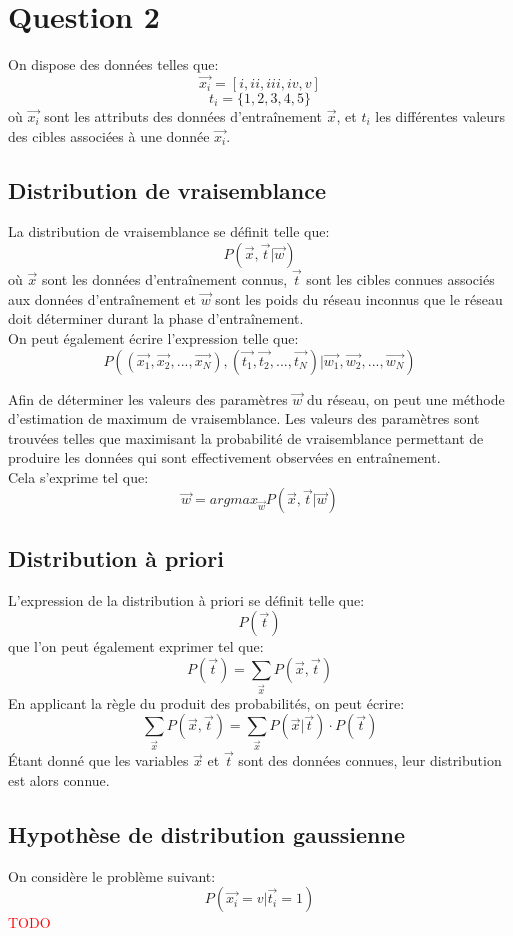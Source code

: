 \section{Question 2}
On dispose des données telles que:
$$ \overrightarrow{x_i} = [i, ii, iii, iv, v] $$
$$ t_i = \{1, 2, 3, 4, 5\} $$ 
où $\overrightarrow{x_i}$ sont les attributs des données d'entraînement $\overrightarrow{x}$, et $t_i$ les différentes valeurs des cibles associées à une donnée $\overrightarrow{x_i}$.

\subsection{Distribution de vraisemblance}
La distribution de vraisemblance se définit telle que: 
$$ P(\overrightarrow{x}, \overrightarrow{t} | \overrightarrow{w}) $$
où $\overrightarrow{x}$ sont les données d'entraînement connus, $\overrightarrow{t}$ sont les cibles connues associés aux données d'entraînement et  $\overrightarrow{w}$ sont les poids du réseau inconnus que le réseau doit déterminer durant la phase d'entraînement. \\
On peut également écrire l'expression telle que:
$$ P((\overrightarrow{x_1}, \overrightarrow{x_2}, ..., \overrightarrow{x_N}), (\overrightarrow{t_1}, \overrightarrow{t_2}, ..., \overrightarrow{t_N}) | \overrightarrow{w_1}, \overrightarrow{w_2}, ..., \overrightarrow{w_N}) $$ 

Afin de déterminer les valeurs des paramètres $\overrightarrow{w}$ du réseau, on peut une méthode d'estimation de maximum de vraisemblance. Les valeurs des paramètres sont trouvées telles que maximisant la probabilité de vraisemblance permettant de produire les données qui sont effectivement observées en entraînement. \\
Cela s'exprime tel que:
$$ \overrightarrow{w} = argmax_{\overrightarrow{w}} P(\overrightarrow{x}, \overrightarrow{t} | \overrightarrow{w}) $$

\subsection{Distribution à priori}
L'expression de la distribution à priori se définit telle que:
$$ P(\overrightarrow{t})  $$
que l'on peut également exprimer tel que:
$$ P(\overrightarrow{t})  = \sum_{\overrightarrow{x}} P(\overrightarrow{x}, \overrightarrow{t}) $$
En applicant la règle du produit des probabilités, on peut écrire:
$$ \sum_{\overrightarrow{x}} P(\overrightarrow{x}, \overrightarrow{t}) =  \sum_{\overrightarrow{x}} P(\overrightarrow{x} | \overrightarrow{t}) \cdot P( \overrightarrow{t})$$
Étant donné que les variables $\overrightarrow{x}$ et $\overrightarrow{t}$ sont des données connues, leur distribution est alors connue. 

\subsection{Hypothèse de distribution gaussienne}
On considère le problème suivant:
$$ P(\overrightarrow{x_i} = v | \overrightarrow{t_i} = 1) $$
\textcolor{red}{TODO}
